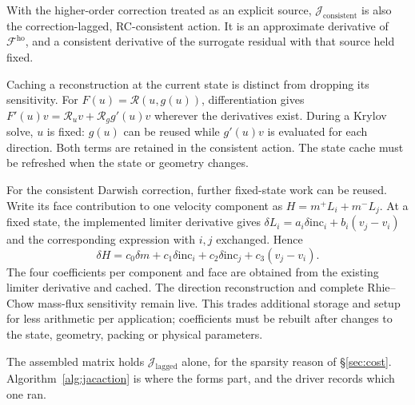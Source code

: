 \documentclass[sigconf,nonacm]{acmart}
\newcommand{\Fho}{\mathcal{F}^{\mathrm{ho}}}
\newcommand{\Jlag}{\mathcal{J}_{\mathrm{lagged}}}
\newcommand{\Jex}{\mathcal{J}_{\mathrm{consistent}}}
\begin{document}
With the higher-order correction treated as an explicit source, $\Jex$ is also the
correction-lagged, RC-consistent action. It is an approximate derivative of $\Fho$, and a consistent
derivative of the surrogate residual with that source held fixed.

Caching a reconstruction at the current state is distinct from dropping its sensitivity.
For $F(u)=\mathcal{R}(u,g(u))$, differentiation gives
$F'(u)v=\mathcal{R}_u v+\mathcal{R}_g g'(u)v$ wherever the derivatives exist.
During a Krylov solve, $u$ is fixed: $g(u)$ can be reused while $g'(u)v$ is evaluated for
each direction. Both terms are retained in the consistent action. The state cache must be
refreshed when the state or geometry changes.

For the consistent Darwish correction, further fixed-state work can be reused.
Write its face contribution to one velocity component as
$H=m^+L_i+m^-L_j$. At a fixed state, the implemented limiter derivative gives
$\delta L_i=a_i\delta\mathrm{inc}_i+b_i(v_j-v_i)$ and the corresponding expression
with $i,j$ exchanged. Hence
\begin{equation}
 \delta H=c_0\delta m+c_1\delta\mathrm{inc}_i+
          c_2\delta\mathrm{inc}_j+c_3(v_j-v_i).
 \label{eq:darwishcache}
\end{equation}
The four coefficients per component and face are obtained from the existing
limiter derivative and cached. The direction reconstruction and complete
Rhie--Chow mass-flux sensitivity remain live. This trades additional storage
and setup for less arithmetic per application; coefficients must be rebuilt
after changes to the state, geometry, packing or physical parameters.

The assembled matrix holds $\Jlag$ alone, for the sparsity reason of
\S\ref{sec:cost}. Algorithm~\ref{alg:jacaction} is where the forms part, and the driver
records which one ran.
\end{document}
